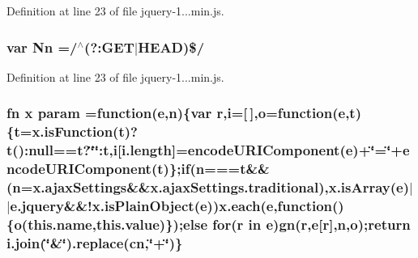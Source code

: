 Definition at line 23 of file jquery-\/1...\+min.\+js.

\hypertarget{obj_2_release_2_package_2_package_tmp_2_scripts_2jquery-1_810_82_8min_8js_a03586bb881647685652f72d98d189ed0}{}
\subsubsection[{Nn}]{\setlength{\rightskip}{0pt plus 5cm}var Nn =/$^\wedge$(?\+:G\+E\+T$\vert$H\+E\+A\+D)\$/}\label{obj_2_release_2_package_2_package_tmp_2_scripts_2jquery-1_810_82_8min_8js_a03586bb881647685652f72d98d189ed0}


Definition at line 23 of file jquery-\/1...\+min.\+js.

\hypertarget{obj_2_release_2_package_2_package_tmp_2_scripts_2jquery-1_810_82_8min_8js_ae8915303d11557d1b001bc56b6195251}{}
\subsubsection[{param}]{ {\bf fn} {\bf x} param =function({\bf e},n)\{var r,{\bf i}=\mbox{[}$\,$\mbox{]},{\bf o}=function({\bf e},{\bf t})\{{\bf t}=x.\+is\+Function({\bf t})?{\bf t}()\+:null=={\bf t}?\char`\"{}\char`\"{}\+:{\bf t},{\bf i}\mbox{[}i.\+length\mbox{]}=encode\+U\+R\+I\+Component({\bf e})+\char`\"{}=\char`\"{}+encode\+U\+R\+I\+Component({\bf t})\};{\bf if}(n==={\bf t}\&\&(n=x.\+ajax\+Settings\&\&x.\+ajax\+Settings.\+traditional),x.\+is\+Array({\bf e})$\vert$$\vert$e.\+jquery\&\&!x.\+is\+Plain\+Object({\bf e})){\bf x.\+each}({\bf e},function()\{{\bf o}(this.\+name,this.\+value)\});{\bf else} for(r in {\bf e}){\bf gn}(r,{\bf e}\mbox{[}r\mbox{]},n,{\bf o});return i.\+join(\char`\"{}\&\char`\"{}).replace({\bf cn},\char`\"{}+\char`\"{})\}}\label{obj_2_release_2_package_2_package_tmp_2_scripts_2jquery-1_810_82_8min_8js_ae8915303d11557d1b001bc56b6195251}


